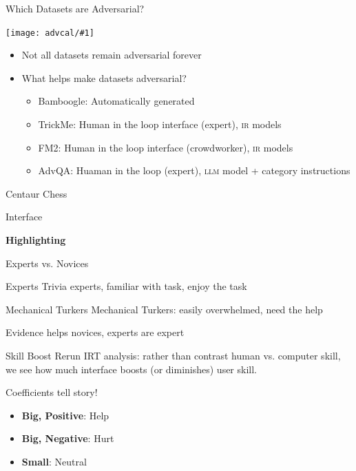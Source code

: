 \documentclass[compress]{beamer}
\newcommand{\abr}[1]{\textsc{#1} }
\newcommand{\fsi}[2]{
\begin{frame}[plain]
\vspace*{-1pt}
\makebox[\linewidth]{\texttt{[image: \#1]}}
\begin{center}
#2
\end{center}
\end{frame}
}
\newcommand{\gfxa}[2]{
	\begin{center}
		\texttt{[image: advcal/\#1]}
	\end{center}
}
\begin{document}
    \begin{frame}{Which Datasets are Adversarial?}
      \gfxa{cumulative_advscore}{.9}

      \begin{itemize}
      \item Not all datasets remain adversarial forever
      \item What helps make datasets adversarial?
        \begin{itemize}
          \item Bamboogle: Automatically generated          
          \item TrickMe: Human in the loop interface (expert), \abr{ir} models
        \item FM2: Human in the loop interface (crowdworker), \abr{ir} models
        \item AdvQA: Huaman in the loop (expert), \abr{llm} model + category instructions
        \end{itemize}

      \end{itemize}
    \end{frame}

\fsi{simtrans/centaur-chess}{Centaur Chess}

\fsi{qb/augment/screenshot_all}{Interface}

\fsi{qb/augment/screenshot_guesses}{}

\fsi{qb/augment/screenshot_highlight}{{\bf Highlighting}}

\fsi{qb/augment/screenshot_evidence}{}

\begin{frame}{Experts vs. Novices}

 \begin{block}{Experts}
   Trivia experts, familiar with task, enjoy the task
 \end{block}

 \begin{block}{Mechanical Turkers}
   Mechanical Turkers: easily overwhelmed, need the help
 \end{block}

\end{frame}

\fsi{qb/augment/tools_acc}{Evidence helps novices, experts are expert}

\begin{frame}{Skill Boost}
  Rerun IRT analysis: rather than contrast human vs. computer skill,
  we see how much interface boosts (or diminishes) user skill.
    \pause

    \begin{block}{Coefficients tell story!}
      \begin{itemize}
        \item {\bf Big, Positive}: Help
        \item {\bf Big, Negative}: Hurt
        \item {\bf Small}: Neutral
      \end{itemize}
    \end{block}

\end{frame}
\end{document}
